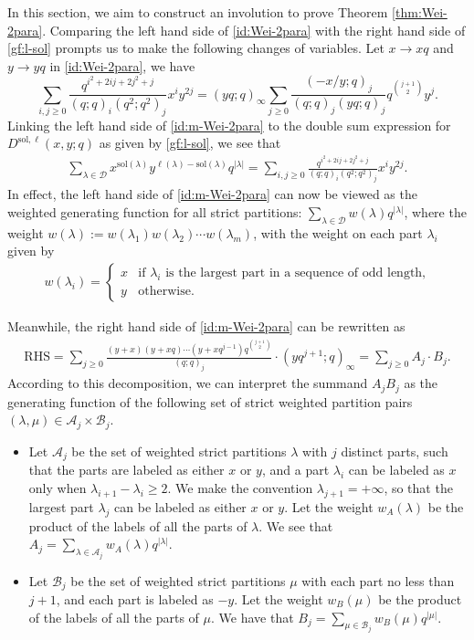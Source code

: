 \documentclass[11pt,reqno]{amsart}
\numberwithin{equation}{section}
\theoremstyle{plain}
\theoremstyle{definition}
\newcommand{\abs}[1]{\left|#1\right|}
\def\A{\mathcal{A}}
\def\sol{\mathrm{sol}}
\def\la{\lambda}
\newcommand{\B}{\mathcal{B}}
\newcommand{\D}{\mathcal{D}}
\begin{document}
In this section, we aim to construct an involution to prove Theorem \ref{thm:Wei-2para}. Comparing the left hand side of \eqref{id:Wei-2para} with the right hand side of \eqref{gf:l-sol} prompts us to make the following changes of variables. Let $x\rightarrow xq$ and $y\rightarrow yq$ in \eqref{id:Wei-2para}, we have
\begin{equation}
\sum\limits_{i, j\geq 0}\frac{q^{i^2+2ij+2j^2+j}}{(q; q)_{i}(q^2; q^2)_{j}}x^{i}y^{2j}=(yq; q)_{\infty}\sum\limits_{j\geq 0}\frac{(-x/y; q)_{j}}{(q; q)_{j}(yq; q)_{j}}q^{\binom{j+1}{2}}y^{j}.\label{id:m-Wei-2para}
\end{equation}
Linking the left hand side of \eqref{id:m-Wei-2para} to the double sum expression for $D^{\sol,\ell}(x,y;q)$ as given by \eqref{gf:l-sol}, we see that
\begin{align*}
\sum_{\la\in \D}x^{\sol(\la)}y^{\ell(\la)-\sol(\la)}q^{|\la|}=\sum\limits_{i, j\geq 0}\frac{q^{i^2+2ij+2j^2+j}}{(q; q)_{i}(q^2; q^2)_{j}}x^{i}y^{2j}.
\end{align*}
In effect, the left hand side of \eqref{id:m-Wei-2para} can now be viewed as the weighted generating function for all strict partitions: $\sum_{\la\in\D}w(\la)q^{\abs{\la}}$, where the weight $w(\la):=w(\la_1)w(\la_2)\cdots w(\la_m)$, with the weight on each part $\la_i$ given by
\begin{align*}
w(\la_i)=
\begin{cases}
x & \text{if $\la_i$ is the largest part in a sequence of odd length,}\\
y & \text{otherwise.}
\end{cases}
\end{align*}



Meanwhile, the right hand side of \eqref{id:m-Wei-2para} can be rewritten as
\begin{align*}
\text{RHS}=\sum\limits_{j\geq 0}\frac{(y+x)(y+xq)\cdots (y+xq^{j-1})q^{\binom{j+1}{2}}}{(q; q)_{j}}\cdot(yq^{j+1}; q)_{\infty}=\sum_{j\geq 0}A_{j}\cdot B_{j}.
\end{align*}
According to this decomposition, we can interpret the summand $A_jB_j$ as the generating function of the following set of strict weighted partition pairs $(\la,\mu)\in\A_j\times\B_j$.
\begin{itemize}
\item Let $\A_j$ be the set of weighted strict partitions $\la$ with $j$ distinct parts, such that the parts are labeled as either $x$ or $y$, and a part $\la_i$ can be labeled as $x$ only when $\la_{i+1}-\la_i\geq 2$. We make the convention $\la_{j+1}=+\infty$, so that the largest part $\la_j$ can be labeled as either $x$ or $y$. Let the weight $w_A(\la)$ be the product of the labels of all the parts of $\la$. We see that $A_j=\sum_{\la\in\A_j}w_A(\la)q^{\abs{\la}}$.
\item Let $\B_j$ be the set of weighted strict partitions $\mu$ with each part no less than $j+1$, and each part is labeled as $-y$. Let the weight $w_B(\mu)$ be the product of the labels of all the parts of $\mu$. We have that $B_j=\sum_{\mu\in\B_j}w_B(\mu)q^{\abs{\mu}}$.
\end{itemize}
\end{document}
